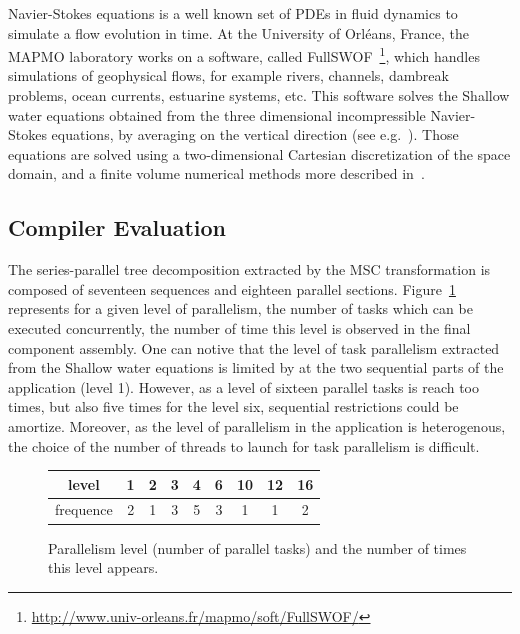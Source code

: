 Navier-Stokes equations is a well known set of PDEs in fluid dynamics to simulate a flow evolution in time. At the University of Orl\'eans, France, the MAPMO laboratory works on a software, called FullSWOF~\footnote{\url{http://www.univ-orleans.fr/mapmo/soft/FullSWOF/}}, which handles simulations of geophysical flows, for example rivers, channels, dambreak problems, ocean currents, estuarine systems, etc. This software solves the Shallow water equations obtained from the three dimensional incompressible Navier-Stokes equations, by averaging on the vertical direction (see e.g.~\cite{Ferrari2004}). Those equations are solved using a two-dimensional Cartesian discretization of the space domain, and a finite volume numerical methods more described in~\cite{HeleneLS13}.

\subsection*{Compiler Evaluation}

The series-parallel tree decomposition extracted by the MSC transformation is composed of seventeen sequences and eighteen parallel sections. Figure~\ref{fig:freq} represents for a given level of parallelism, \ie the number of tasks which can be executed concurrently, the number of time this level is observed in the final component assembly. One can notive that the level of task parallelism extracted from the Shallow water equations is limited by at the two sequential parts of the application (level 1). However, as a level of sixteen parallel tasks is reach too times, but also five times for the level six, sequential restrictions could be amortize. Moreover, as the level of parallelism in the application is heterogenous, the choice of the number of threads to launch for task parallelism is difficult.

\begin{figure}[!h]
 \begin{center}
 \begin{tabular}{c|c|c|c|c|c|c|c|c|}
   level & 1 & 2 & 3 & 4 & 6 & 10 & 12 & 16\\
   \hline
   frequence & 2 & 1 & 3 & 5 & 3 & 1 & 1 & 2\\
 \end{tabular}
\caption{Parallelism level (number of parallel tasks) and the number of times this level appears.}
\label{fig:freq}
 \end{center}
\end{figure}

